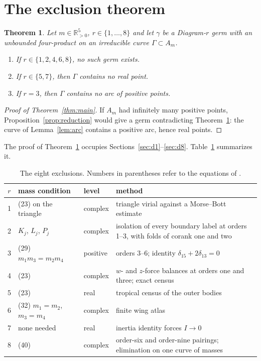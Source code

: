 \documentclass[11pt]{amsart}
\newenvironment{alphalist}{\begin{enumerate}\renewcommand{\labelenumi}{(\alph{enumi})}%
  \renewcommand{\theenumi}{\alph{enumi}}}{\end{enumerate}}
\newtheorem{theorem}{Theorem}[section]
\theoremstyle{definition}
\theoremstyle{remark}
\newcommand{\Rp}{\mathbb{R}_{>0}}
\begin{document}
\section{The exclusion theorem}\label{sec:exclusion}

\begin{theorem}\label{thm:exclusion}
Let $m\in\Rp^5$, $r\in\{1,\dots,8\}$ and let $\gamma$ be a Diagram-$r$ germ with an unbounded
four-product on an irreducible curve $\Gamma\subset A_m$.
\begin{alphalist}
  \item If $r\in\{1,2,4,6,8\}$, no such germ exists.
  \item If $r\in\{5,7\}$, then $\Gamma$ contains no real point.
  \item If $r=3$, then $\Gamma$ contains no arc of positive points.
\end{alphalist}
\end{theorem}

\begin{proof}[Proof of Theorem~\ref{thm:main}]
If $A_m$ had infinitely many positive points, Proposition~\ref{prop:reduction} would give a germ
contradicting Theorem~\ref{thm:exclusion}: the curve of Lemma~\ref{lem:arc} contains a positive
arc, hence real points.
\end{proof}

The proof of Theorem~\ref{thm:exclusion} occupies Sections~\ref{sec:d1}--\ref{sec:d8}.
Table~\ref{tab:exclusions} summarizes it.

\begin{table}[ht]
\centering
\small
\begin{tabular}{cllp{5.4cm}}
\hline
$r$ & mass condition & level & method \\
\hline
1 & (23) on the triangle & complex & triangle virial against a Morse--Bott estimate \\
2 & $K_j$, $L_j$, $P_j$ & complex & isolation of every boundary label at orders 1--3,
with folds of corank one and two \\
3 & (29) $m_1m_3=m_2m_4$ & positive & orders 3--6; identity $\delta_{15}+2\delta_{13}=0$ \\
4 & (23) & complex & $w$- and $z$-force balances at orders one and three; exact census \\
5 & (23) & real & tropical census of the outer bodies \\
6 & (32) $m_1=m_2$, $m_3=m_4$ & complex & finite wing atlas \\
7 & none needed & real & inertia identity forces $I\to0$ \\
8 & (40) & complex & order-six and order-nine pairings; elimination on one curve of masses \\
\hline
\end{tabular}
\caption{The eight exclusions.  Numbers in parentheses refer to the equations of
\cite[\S8]{AK}.}\label{tab:exclusions}
\end{table}
\end{document}
